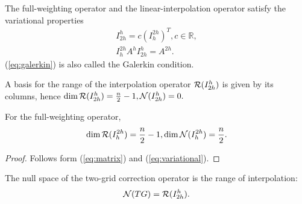 \begin{lem}
  The full-weighting operator and the linear-interpolation
  operator satisfy the variational properties
  \begin{subequations}
    \begin{align}
      I^h_{2h}=c(I^{2h}_h)^T, c\in \mathbb{R},\label{eq:variational}\\
      I^{2h}_hA^hI^h_{2h}=A^{2h}.\label{eq:galerkin}
    \end{align}
  \end{subequations}
(\ref{eq:galerkin}) is also called the Galerkin condition.
\end{lem}

\begin{prop}
  A basis for the range of the interpolation operator
  ${\cal R}(I^h_{2h})$ is given by its columns,
  hence $\dim {\cal R}(I^h_{2h})=\frac{n}{2}-1,{\cal N}(I^h_{2h})=0.$
\end{prop}

\begin{coro}
For the full-weighting operator,
\begin{equation}
  \dim {\cal R}(I^{2h}_h)=\frac{n}{2}-1,
  \dim {\cal N}(I^{2h}_h)=\frac{n}{2}.
\end{equation}
\end{coro}

\begin{proof}
 Follows form (\ref{eq:matrix}) and (\ref{eq:variational}).
\end{proof}

\begin{thm}
  The null space of the two-grid correction operator is the range of
  interpolation:
  \begin{equation}
    {\cal N}(TG)={\cal R}(I^h_{2h}).
  \end{equation}

\end{thm}




